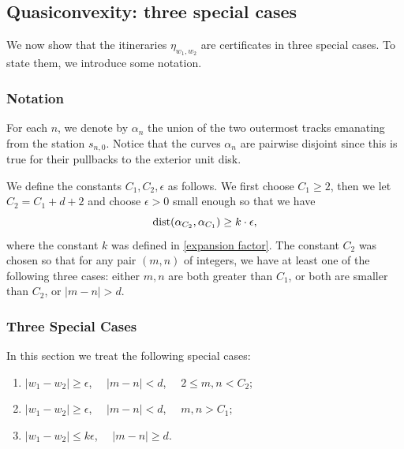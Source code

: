 \bigskip

  \label{fig:proof-triangle-ineq}


\subsection{Quasiconvexity: three special cases}

We now show that the itineraries $\eta_{w_1,w_2}$ are certificates in three special cases. To state them, we introduce some notation.

\subsubsection{Notation}

For each $n$, we denote by  $\alpha_n$ the union of the two outermost tracks emanating from the station $s_{n,0}$. 
Notice that the curves $\alpha_n$ are pairwise disjoint since this is true for their pullbacks to the exterior unit disk.

We define the constants $C_1, C_2, \epsilon$ as follows. We first choose $C_1 \ge 2$, then we let $C_2 = C_1 + d+2$ and choose $\epsilon >0$ small enough so that we have 
\begin{equation}
	\operatorname{dist}(\alpha_{C_2}, \alpha_{C_1}) \geq k \cdot \epsilon,
\end{equation}
where the constant $k$ was defined in \cref{expansion factor}.
The constant $C_2$ was chosen so that for any pair $(m,n)$ of integers, we have at least one of the following three cases: either $m,n$ are both greater than $C_1$, or both are smaller than $C_2$, or $|m-n| > d$.

\subsubsection{Three Special Cases}
In this section we treat the following special cases:
\begin{enumerate}
	\item $|w_1-w_2| \geq  \epsilon$, $\quad |m-n|<d$, $\quad 2 \le m,n < C_2$; %
	\item $|w_1-w_2| \geq \epsilon$, $\quad |m-n|<d$, $\quad  m,n> C_1$; %
	\item $|w_1-w_2| \leq k \epsilon$, $\quad |m-n| \geq d$.
\end{enumerate}

